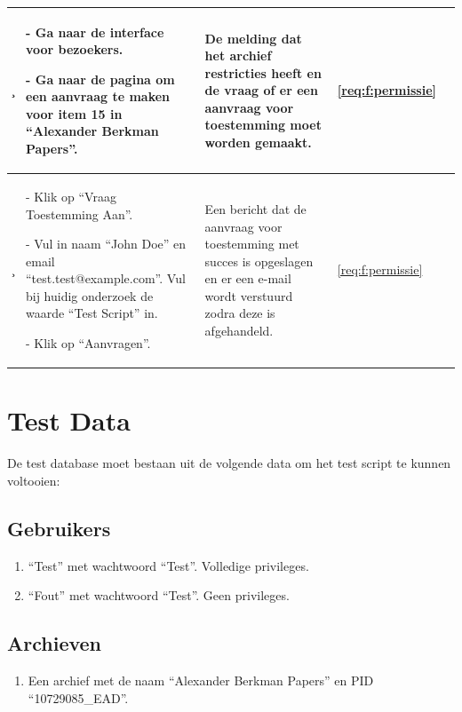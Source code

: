 \documentclass[a4paper,titlepage]{report}
\begin{document}
\begin{longtable}{| m{} | m{}
      | m{} | m{} | m{} |}
      \c &
      \par - Ga naar de interface voor bezoekers.
      \par - Ga naar de pagina om een aanvraag te maken voor item 15 in
        ``Alexander Berkman Papers''.
      & \par De melding dat het archief restricties heeft en de vraag of 
        er een aanvraag voor toestemming moet worden gemaakt.
      & \ref{req:f:permissie}
      & \\\hline

      \c &
      \par - Klik op ``Vraag Toestemming Aan''.
      \par - Vul in naam ``John Doe'' en email ``test.test@example.com''.
        Vul bij huidig onderzoek de waarde ``Test Script'' in.
      \par - Klik op ``Aanvragen''.
      & \par Een bericht dat de aanvraag voor toestemming met succes is
        opgeslagen en er een e-mail wordt verstuurd zodra deze is afgehandeld.
      & \ref{req:f:permissie}
      & \\\hline
    \end{longtable}

  \pagebreak
  \section{Test Data}
    \label{sec:testdata}
    De test database moet bestaan uit de volgende data om het test script te
    kunnen voltooien:

    \subsection{Gebruikers}
      \begin{enumerate}
        \item ``Test'' met wachtwoord ``Test''. Volledige privileges.
        \item ``Fout'' met wachtwoord ``Test''. Geen privileges.
      \end{enumerate}
    \subsection{Archieven}
      \begin{enumerate}
        \item Een archief met de naam ``Alexander Berkman Papers'' en PID
        ``10729085\_EAD''.
      \end{enumerate}
\end{document}
